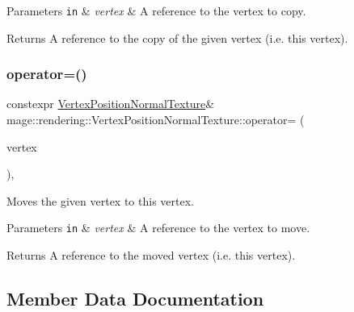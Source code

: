 \begin{DoxyParams}[1]{Parameters}
\mbox{\tt in}  & {\em vertex} & A reference to the vertex to copy. \\
\hline
\end{DoxyParams}
\begin{DoxyReturn}{Returns}
A reference to the copy of the given vertex (i.\+e. this vertex). 
\end{DoxyReturn}
\mbox{\label{structmage_1_1rendering_1_1_vertex_position_normal_texture_a16913ccdaec3d1a0a67b4ba33cc7b7d1}} 
\subsubsection{\texorpdfstring{operator=()}{operator=()}\hspace{0.1cm}{\footnotesize\ttfamily [2/2]}}
{\footnotesize\ttfamily constexpr \mbox{\hyperlink{structmage_1_1rendering_1_1_vertex_position_normal_texture}{Vertex\+Position\+Normal\+Texture}}\& mage\+::rendering\+::\+Vertex\+Position\+Normal\+Texture\+::operator= (\begin{DoxyParamCaption}\item[{\mbox{\hyperlink{structmage_1_1rendering_1_1_vertex_position_normal_texture}{Vertex\+Position\+Normal\+Texture}} \&\&}]{vertex }\end{DoxyParamCaption})\hspace{0.3cm}{\ttfamily [default]}, {\ttfamily [noexcept]}}

Moves the given vertex to this vertex.


\begin{DoxyParams}[1]{Parameters}
\mbox{\tt in}  & {\em vertex} & A reference to the vertex to move. \\
\hline
\end{DoxyParams}
\begin{DoxyReturn}{Returns}
A reference to the moved vertex (i.\+e. this vertex). 
\end{DoxyReturn}


\subsection{Member Data Documentation}
\mbox{\label{structmage_1_1rendering_1_1_vertex_position_normal_texture_a7c800b1234a9291361a21ce2289b1394}} 
